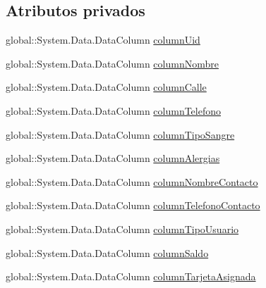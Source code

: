 \subsection*{Atributos privados}
\begin{DoxyCompactItemize}
\item 
global\-::\-System.\-Data.\-Data\-Column \hyperlink{class_proyecto___integrador__3_1_1ds_usuarios_1_1_usuarios_data_table_aff1b3e43ca01857d574946308f13c6f5}{column\-Uid}
\item 
global\-::\-System.\-Data.\-Data\-Column \hyperlink{class_proyecto___integrador__3_1_1ds_usuarios_1_1_usuarios_data_table_a8bc5ddc1090c271f2438c39ff832cf6c}{column\-Nombre}
\item 
global\-::\-System.\-Data.\-Data\-Column \hyperlink{class_proyecto___integrador__3_1_1ds_usuarios_1_1_usuarios_data_table_a84de0144da103ba5bc2a1c48e824d49d}{column\-Calle}
\item 
global\-::\-System.\-Data.\-Data\-Column \hyperlink{class_proyecto___integrador__3_1_1ds_usuarios_1_1_usuarios_data_table_a419f31ea3bb10486566a669c0838855d}{column\-Telefono}
\item 
global\-::\-System.\-Data.\-Data\-Column \hyperlink{class_proyecto___integrador__3_1_1ds_usuarios_1_1_usuarios_data_table_ad853158916e076be016cd52dc50504a7}{column\-Tipo\-Sangre}
\item 
global\-::\-System.\-Data.\-Data\-Column \hyperlink{class_proyecto___integrador__3_1_1ds_usuarios_1_1_usuarios_data_table_afd6b2ab9618c5bcfa6d2837c4709b6fa}{column\-Alergias}
\item 
global\-::\-System.\-Data.\-Data\-Column \hyperlink{class_proyecto___integrador__3_1_1ds_usuarios_1_1_usuarios_data_table_a16ac4bffb8b2cd014f1bbec318b3e275}{column\-Nombre\-Contacto}
\item 
global\-::\-System.\-Data.\-Data\-Column \hyperlink{class_proyecto___integrador__3_1_1ds_usuarios_1_1_usuarios_data_table_a05833005cbc7f43edd9b091088296d8d}{column\-Telefono\-Contacto}
\item 
global\-::\-System.\-Data.\-Data\-Column \hyperlink{class_proyecto___integrador__3_1_1ds_usuarios_1_1_usuarios_data_table_a8938f731b53fecd95f82aa86ae3db1d2}{column\-Tipo\-Usuario}
\item 
global\-::\-System.\-Data.\-Data\-Column \hyperlink{class_proyecto___integrador__3_1_1ds_usuarios_1_1_usuarios_data_table_a2c6a39259573ff67502746b7c598768f}{column\-Saldo}
\item 
global\-::\-System.\-Data.\-Data\-Column \hyperlink{class_proyecto___integrador__3_1_1ds_usuarios_1_1_usuarios_data_table_a504be60e812d907c7136a5e3851d016b}{column\-Tarjeta\-Asignada}

\end{DoxyCompactItemize}
